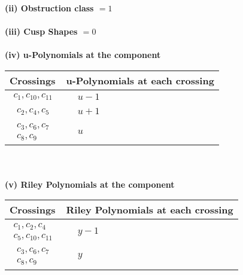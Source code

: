 \documentclass[1p]{elsarticle_modified}
\theoremstyle{definition}
\begin{document}
\flushleft \textbf{(ii) Obstruction class $= 1$}\\~\\
\flushleft \textbf{(iii) Cusp Shapes $= 0$}\\~\\
\newpage\renewcommand{\arraystretch}{1}
\flushleft \textbf{(iv) u-Polynomials at the component}\newline \\
\begin{tabular}{m{50pt}|m{274pt}}
Crossings & \hspace{64pt}u-Polynomials at each crossing \\
\hline $$\begin{aligned}c_{1},c_{10},c_{11}\end{aligned}$$&$\begin{aligned}
&u-1
\end{aligned}$\\
\hline $$\begin{aligned}c_{2},c_{4},c_{5}\end{aligned}$$&$\begin{aligned}
&u+1
\end{aligned}$\\
\hline $$\begin{aligned}c_{3},c_{6},c_{7}\\c_{8},c_{9}\end{aligned}$$&$\begin{aligned}
&u
\end{aligned}$\\
\hline
\end{tabular}\\~\\
\newpage\renewcommand{\arraystretch}{1}
\flushleft \textbf{(v) Riley Polynomials at the component}\newline \\
\begin{tabular}{m{50pt}|m{274pt}}
Crossings & \hspace{64pt}Riley Polynomials at each crossing \\
\hline $$\begin{aligned}c_{1},c_{2},c_{4}\\c_{5},c_{10},c_{11}\end{aligned}$$&$\begin{aligned}
&y-1
\end{aligned}$\\
\hline $$\begin{aligned}c_{3},c_{6},c_{7}\\c_{8},c_{9}\end{aligned}$$&$\begin{aligned}
&y
\end{aligned}$\\
\hline
\end{tabular}\\~\\
\end{document}
